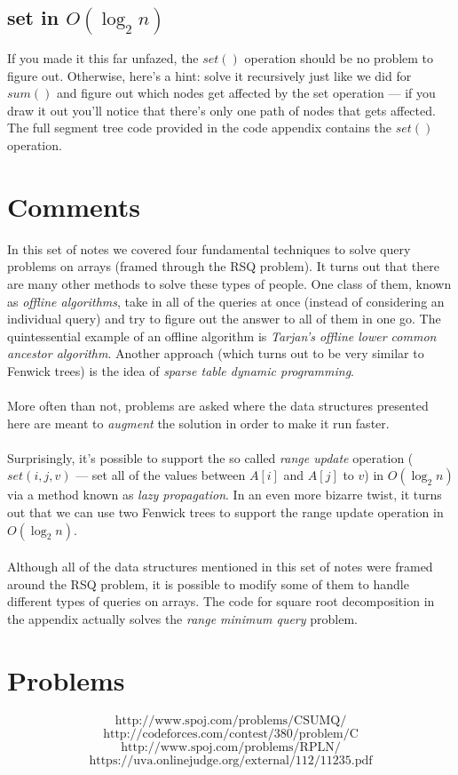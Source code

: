\documentclass[11pt]{article}
\theoremstyle{plain}
\theoremstyle{definition}
\begin{document}
\subsection{set in $O(\log_2{n})$}
If you made it this far unfazed, the $set()$ operation should be no problem to figure out. Otherwise, here's a hint: solve it recursively just like we did for $sum()$ and figure out which nodes get affected by the set operation --- if you draw it out you'll notice that there's only one path of nodes that gets affected. The full segment tree code provided in the code appendix contains the $set()$ operation.
\section{Comments}
In this set of notes we covered four fundamental techniques to solve query problems on arrays (framed through the RSQ problem). It turns out that there are many other methods to solve these types of people. One class of them, known as \emph{offline algorithms}, take in all of the queries at once (instead of considering an individual query) and try to figure out the answer to all of them in one go. The quintessential example of an offline algorithm is \emph{Tarjan's offline lower common ancestor algorithm}. Another approach (which turns out to be very similar to Fenwick trees) is the idea of \emph{sparse table dynamic programming}.\\\\
More often than not, problems are asked where the data structures presented here are meant to \emph{augment} the solution in order to make it run faster.\\\\
Surprisingly, it's possible to support the so called \emph{range update} operation ($set(i, j, v)$ --- set all of the values between $A[i]$ and $A[j]$ to $v$) in $O(\log_2{n})$ via a method known as \emph{lazy propagation}. In an even more bizarre twist, it turns out that we can use two Fenwick trees to support the range update operation in $O(\log_2{n})$. \\\\
Although all of the data structures mentioned in this set of notes were framed around the RSQ problem, it is possible to modify some of them to handle different types of queries on arrays. The code for square root decomposition in the appendix actually solves the \emph{range minimum query} problem.
\section{Problems}
$$\boxed{\text{http://www.spoj.com/problems/CSUMQ/}}$$
$$\boxed{\text{http://codeforces.com/contest/380/problem/C}}$$
$$\boxed{\text{http://www.spoj.com/problems/RPLN/}}$$
$$\boxed{\text{https://uva.onlinejudge.org/external/112/11235.pdf}}$$
\end{document}
